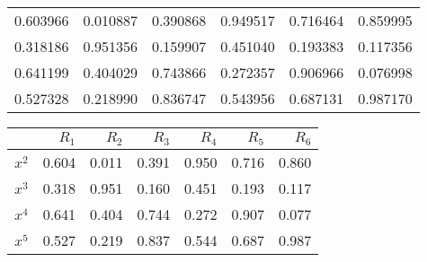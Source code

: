 \documentclass[12pt]{article}
\begin{document}
\newpage

\clearpage


\begin{tabular}{rrrrrr}
\toprule
0.603966 & 0.010887 & 0.390868 & 0.949517 & 0.716464 & 0.859995 \\
0.318186 & 0.951356 & 0.159907 & 0.451040 & 0.193383 & 0.117356 \\
0.641199 & 0.404029 & 0.743866 & 0.272357 & 0.906966 & 0.076998 \\
0.527328 & 0.218990 & 0.836747 & 0.543956 & 0.687131 & 0.987170 \\
\bottomrule
\end{tabular}

\newpage

\clearpage


\begin{tabular}{lrrrrrr}
\toprule
{} &  $R_{1}$ &  $R_{2}$ &  $R_{3}$ &  $R_{4}$ &  $R_{5}$ &  $R_{6}$ \\
\midrule
$x^{2}$ &    0.604 &    0.011 &    0.391 &    0.950 &    0.716 &    0.860 \\
$x^{3}$ &    0.318 &    0.951 &    0.160 &    0.451 &    0.193 &    0.117 \\
$x^{4}$ &    0.641 &    0.404 &    0.744 &    0.272 &    0.907 &    0.077 \\
$x^{5}$ &    0.527 &    0.219 &    0.837 &    0.544 &    0.687 &    0.987 \\
\bottomrule
\end{tabular}
\end{document}
